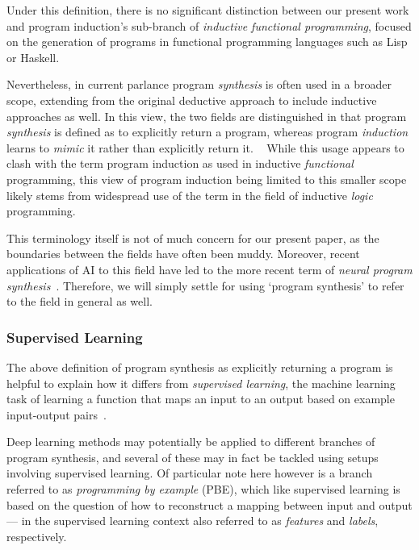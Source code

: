 \documentclass{article}
\begin{document}
Under this definition, there is no significant distinction between our present work and program induction's sub-branch of \emph{inductive functional programming}, focused on the generation of programs in functional programming languages such as Lisp~\citep{lisp} or Haskell.

Nevertheless, in current parlance program \emph{synthesis} is often used in a broader scope, extending from the original deductive approach to include inductive approaches as well.
In this view, the two fields are distinguished in that program \emph{synthesis} is defined as to explicitly return a program,
whereas program \emph{induction} learns to \emph{mimic} it rather than explicitly return it.%
~\citep{devlin2017robustfill,gulwani2017program,nps}
While this usage appears to clash with the term program induction as used in inductive \emph{functional} programming,
this view of program induction being limited to this smaller scope likely stems from widespread use of the term in the field of inductive \emph{logic} programming.

This terminology itself is not of much concern for our present paper, as the boundaries between the fields have often been muddy.
Moreover, recent applications of AI to this field have led to the more recent term of \emph{neural program synthesis}~\citep{nps}. Therefore, we will simply settle for using `program synthesis' to refer to the field in general as well.

\subsubsection{Supervised Learning}

The above definition of program synthesis as explicitly returning a program
is helpful to explain how it differs from \emph{supervised learning},
the machine learning task of learning a function that maps an input to an output based on example input-output pairs~\citep{russell2002artificial}.

Deep learning methods may potentially be applied to different branches of program synthesis,
and several of these may in fact be tackled using setups involving supervised learning.
Of particular note here however is a branch referred to as \emph{programming by example} (PBE),
which like supervised learning is based on the question of how to reconstruct a mapping between input and output --- in the supervised learning context also referred to as \emph{features} and \emph{labels}, respectively.
\end{document}
